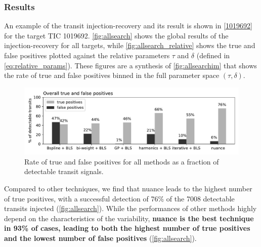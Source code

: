 \documentclass[modern]{aastex631}
\newcommand{\nuancecode}{\textsf{nuance}}
\begin{document}
\subsubsection*{Results}
An example of the transit injection-recovery and its result is shown in \autoref{1019692} for the target TIC 1019692. \autoref{fig:allsearch} shows the global results of the injection-recovery for all targets, while \autoref{fig:allsearch_relative} shows the true and false positives plotted against the relative parameters $\tau$ and $\delta$ (defined in \autoref{eq:relative_params}). These figures are a synthesis of \autoref{fig:allsearchim} that shows the rate of true and false positives binned in the full parameter space $(\tau, \delta)$.
\begin{figure}[H]
    \begin{centering}
        \includegraphics[width=\linewidth]{../workflows/tess_injection_recovery/figures/tpfp_bars.pdf}
        \caption{Rate of true and false positives for all methods as a fraction of detectable transit signals.}
        \label{fig:allsearch}
    \end{centering}
\end{figure}
Compared to other techniques, we find that \nuancecode{} leads to the highest number of true positives, with a successful detection of 76\% of the 7008 detectable transits injected (\autoref{fig:allsearch}). While the performances of other methods highly depend on the characteristics of the variability, \textbf{\nuancecode{} is the best technique in 93\% of cases, leading to both the highest number of true positives and the lowest number of false positives} (\autoref{fig:allsearch}).
\end{document}
